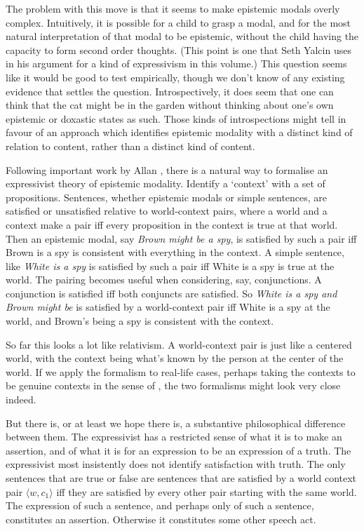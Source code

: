The problem with this move is that it seems to make epistemic modals overly complex. Intuitively, it is possible for a child to grasp a modal, and for the most natural interpretation of that modal to be epistemic, without the child having the capacity to form second order thoughts. (This point is one that Seth Yalcin uses in his argument for a kind of expressivism in this volume.) This question seems like it would be good to test empirically, though we don't know of any existing evidence that settles the question. Introspectively, it does seem that one can think that the cat might be in the garden without thinking about one's own epistemic or doxastic states as such. Those kinds of introspections might tell in favour of an approach which identifies epistemic modality with a distinct kind of relation to content, rather than a distinct kind of content.

Following important work by Allan \citet{Gibbard1990}, there is a natural way to formalise an expressivist theory of epistemic modality. Identify a `context' with a set of propositions. Sentences, whether epistemic modals or simple sentences, are satisfied or unsatisfied relative to world-context pairs, where a world and a context make a pair iff every proposition in the context is true at that world. Then an epistemic modal, say \textit{Brown might be a spy}, is satisfied by such a pair iff Brown is a spy is consistent with everything in the context. A simple sentence, like \textit{White is a spy} is satisfied by such a pair iff White is a spy is true at the world. The pairing becomes useful when considering, say, conjunctions. A conjunction is satisfied iff both conjuncts are satisfied. So \textit{White is a spy and Brown might be} is satisfied by a world-context pair iff White is a spy at the world, and Brown's being a spy is consistent with the context.

So far this looks a lot like relativism. A world-context pair is just like a centered world, with the context being what's known by the person at the center of the world. If we apply the formalism to real-life cases, perhaps taking the contexts to be genuine contexts in the sense of \citet{Stalnaker1978}, the two formalisms might look very close indeed.

But there is, or at least we hope there is, a substantive philosophical difference between them. The expressivist has a restricted sense of what it is to make an assertion, and of what it is for an expression to be an expression of a truth. The expressivist most insistently does not identify satisfaction with truth. The only sentences that are true or false are sentences that are satisfied by a world context pair $\langle w,c_1 \rangle$ iff they are satisfied by every other pair starting with the same world. The expression of such a sentence, and perhaps only of such a sentence, constitutes an assertion. Otherwise it constitutes some other speech act.

